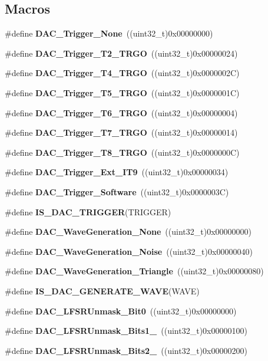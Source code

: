 \subsection*{Macros}
\begin{DoxyCompactItemize}
\item 
\#define \textbf{ D\+A\+C\+\_\+\+Trigger\+\_\+\+None}~((uint32\+\_\+t)0x00000000)
\item 
\#define \textbf{ D\+A\+C\+\_\+\+Trigger\+\_\+\+T2\+\_\+\+T\+R\+GO}~((uint32\+\_\+t)0x00000024)
\item 
\#define \textbf{ D\+A\+C\+\_\+\+Trigger\+\_\+\+T4\+\_\+\+T\+R\+GO}~((uint32\+\_\+t)0x0000002\+C)
\item 
\#define \textbf{ D\+A\+C\+\_\+\+Trigger\+\_\+\+T5\+\_\+\+T\+R\+GO}~((uint32\+\_\+t)0x0000001\+C)
\item 
\#define \textbf{ D\+A\+C\+\_\+\+Trigger\+\_\+\+T6\+\_\+\+T\+R\+GO}~((uint32\+\_\+t)0x00000004)
\item 
\#define \textbf{ D\+A\+C\+\_\+\+Trigger\+\_\+\+T7\+\_\+\+T\+R\+GO}~((uint32\+\_\+t)0x00000014)
\item 
\#define \textbf{ D\+A\+C\+\_\+\+Trigger\+\_\+\+T8\+\_\+\+T\+R\+GO}~((uint32\+\_\+t)0x0000000\+C)
\item 
\#define \textbf{ D\+A\+C\+\_\+\+Trigger\+\_\+\+Ext\+\_\+\+I\+T9}~((uint32\+\_\+t)0x00000034)
\item 
\#define \textbf{ D\+A\+C\+\_\+\+Trigger\+\_\+\+Software}~((uint32\+\_\+t)0x0000003\+C)
\item 
\#define \textbf{ I\+S\+\_\+\+D\+A\+C\+\_\+\+T\+R\+I\+G\+G\+ER}(T\+R\+I\+G\+G\+ER)
\item 
\#define \textbf{ D\+A\+C\+\_\+\+Wave\+Generation\+\_\+\+None}~((uint32\+\_\+t)0x00000000)
\item 
\#define \textbf{ D\+A\+C\+\_\+\+Wave\+Generation\+\_\+\+Noise}~((uint32\+\_\+t)0x00000040)
\item 
\#define \textbf{ D\+A\+C\+\_\+\+Wave\+Generation\+\_\+\+Triangle}~((uint32\+\_\+t)0x00000080)
\item 
\#define \textbf{ I\+S\+\_\+\+D\+A\+C\+\_\+\+G\+E\+N\+E\+R\+A\+T\+E\+\_\+\+W\+A\+VE}(W\+A\+VE)
\item 
\#define \textbf{ D\+A\+C\+\_\+\+L\+F\+S\+R\+Unmask\+\_\+\+Bit0}~((uint32\+\_\+t)0x00000000)
\item 
\#define \textbf{ D\+A\+C\+\_\+\+L\+F\+S\+R\+Unmask\+\_\+\+Bits1\+\_}~((uint32\+\_\+t)0x00000100)
\item 
\#define \textbf{ D\+A\+C\+\_\+\+L\+F\+S\+R\+Unmask\+\_\+\+Bits2\+\_}~((uint32\+\_\+t)0x00000200)

\end{DoxyCompactItemize}
